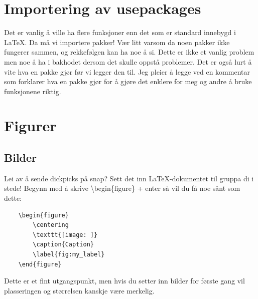 \section{Importering av usepackages}
    Det er vanlig å ville ha flere funksjoner enn det som er standard innebygd i \LaTeX. Da må vi importere pakker! Vær litt varsom da noen pakker ikke fungerer sammen, og rekkefølgen kan ha noe å si. Dette er ikke et vanlig problem men noe å ha i bakhodet dersom det skulle oppstå problemer. Det er også lurt å vite hva en pakke gjør før vi legger den til. Jeg pleier å legge ved en kommentar som forklarer hva en pakke gjør for å gjøre det enklere for meg og andre å bruke funksjonene riktig. 


\section{Figurer} \label{sec:figurer}
    \subsection{Bilder} \label{sec:bilder}
        Lei av å sende dickpicks på snap? Sett det inn \LaTeX-dokumentet til gruppa di i stede!
        Begynn med å skrive \textbackslash begin\{figure\} + enter så vil du få noe sånt som dette:
        \begin{verbatim}
    \begin{figure}
        \centering
        \texttt{[image: ]}
        \caption{Caption}
        \label{fig:my_label}
    \end{figure}
        \end{verbatim}
        Dette er et fint utgangspunkt, men hvis du setter inn bilder for første gang vil plasseringen og størrelsen kanskje være merkelig.
        
